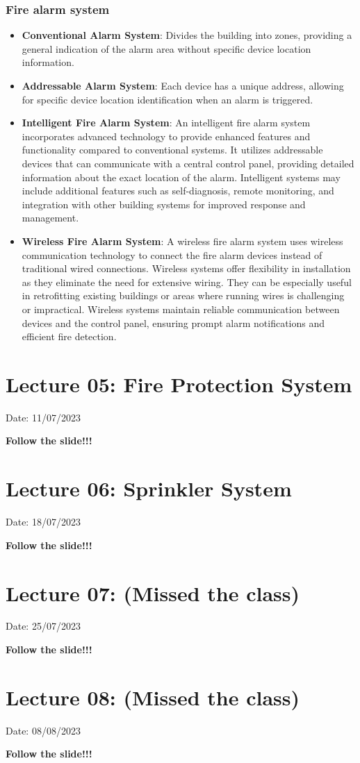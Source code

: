 \documentclass{article}
\begin{document}
\subsubsection*{Fire alarm system} 
\begin{itemize}
  \item \textbf{Conventional Alarm System}: Divides the building into zones, providing a general indication of the alarm area without specific device location information.

  \item \textbf{Addressable Alarm System}: Each device has a unique address, allowing for specific device location identification when an alarm is triggered.

  \item \textbf{Intelligent Fire Alarm System}: An intelligent fire alarm system incorporates advanced technology to provide enhanced features and functionality compared to conventional systems. It utilizes addressable devices that can communicate with a central control panel, providing detailed information about the exact location of the alarm. Intelligent systems may include additional features such as self-diagnosis, remote monitoring, and integration with other building systems for improved response and management.

  \item \textbf{Wireless Fire Alarm System}: A wireless fire alarm system uses wireless communication technology to connect the fire alarm devices instead of traditional wired connections. Wireless systems offer flexibility in installation as they eliminate the need for extensive wiring. They can be especially useful in retrofitting existing buildings or areas where running wires is challenging or impractical. Wireless systems maintain reliable communication between devices and the control panel, ensuring prompt alarm notifications and efficient fire detection.
\end{itemize}

\section{Lecture 05: Fire Protection System} 
\hfill Date: 11/07/2023

\textbf{Follow the slide!!!}
\vspace*{1cm}

\section{Lecture 06: Sprinkler System} 
\hfill Date: 18/07/2023

\textbf{Follow the slide!!!}
\vspace*{1cm}

\section{Lecture 07: (Missed the class)} 
\hfill Date: 25/07/2023

\textbf{Follow the slide!!!}
\vspace*{1cm}

\section{Lecture 08: (Missed the class)} 
\hfill Date: 08/08/2023

\textbf{Follow the slide!!!}
\vspace*{1cm}
\end{document}
